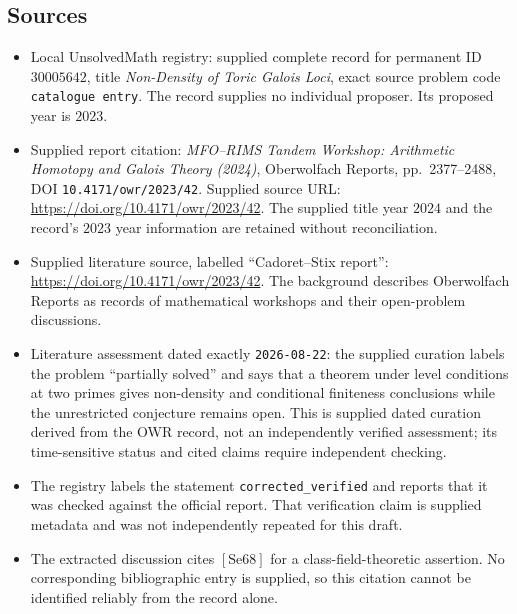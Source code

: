 \documentclass[11pt]{article}
\begin{document}
\subsection{Sources}
\begin{itemize}
\item Local UnsolvedMath registry: supplied complete record for permanent ID \(30005642\), title \emph{Non-Density of Toric Galois Loci}, exact source problem code \texttt{catalogue entry}. The record supplies no individual proposer. Its proposed year is \(2023\).
\item Supplied report citation: \emph{MFO--RIMS Tandem Workshop: Arithmetic Homotopy and Galois Theory (2024)}, Oberwolfach Reports, pp.\ 2377--2488, DOI \texttt{10.4171/owr/2023/42}. Supplied source URL: \url{https://doi.org/10.4171/owr/2023/42}. The supplied title year \(2024\) and the record's \(2023\) year information are retained without reconciliation.
\item Supplied literature source, labelled ``Cadoret--Stix report'': \url{https://doi.org/10.4171/owr/2023/42}. The background describes Oberwolfach Reports as records of mathematical workshops and their open-problem discussions.
\item Literature assessment dated exactly \texttt{2026-08-22}: the supplied curation labels the problem ``partially solved'' and says that a theorem under level conditions at two primes gives non-density and conditional finiteness conclusions while the unrestricted conjecture remains open. This is supplied dated curation derived from the OWR record, not an independently verified assessment; its time-sensitive status and cited claims require independent checking.
\item The registry labels the statement \texttt{corrected\_verified} and reports that it was checked against the official report. That verification claim is supplied metadata and was not independently repeated for this draft.
\item The extracted discussion cites \([\mathrm{Se68}]\) for a class-field-theoretic assertion. No corresponding bibliographic entry is supplied, so this citation cannot be identified reliably from the record alone.
\end{itemize}
\end{document}
